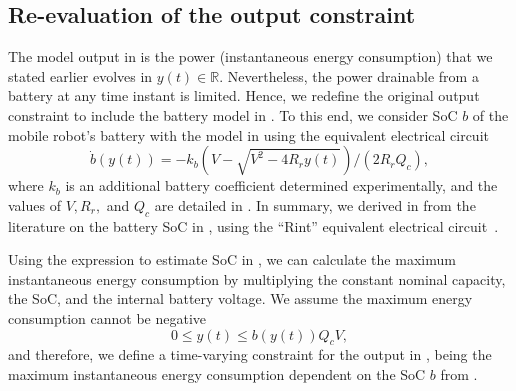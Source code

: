\subsection{Re-evaluation of the output constraint}
\label{sec:mpc-output-const}

The model output in  is the power (instantaneous energy consumption) that we stated earlier evolves in $y(t)\in\mathbb{R}$. Nevertheless, the power drainable from a battery at any time instant is limited. Hence, we redefine the original output constraint to include the battery model in . To this end, we consider SoC $b$ of the mobile robot's battery with the model in  using the equivalent electrical circuit
\begin{equation}\label{eq:bat}
  \dot{b}(y(t))=-k_b\left(V-
  \sqrt{
    V^2-
    4R_ry(t)}
  \right)/(2R_rQ_c),
\end{equation}
where $k_b$ is an additional battery coefficient determined experimentally, and the values of $V,R_r,$ and $Q_c$ are detailed in .
In summary, we derived  in  from the literature on the battery SoC in , using the ``Rint'' equivalent electrical circuit~\citep{mousavi2014various,hinz2019comparison,he2011evaluation}. 

Using the expression to estimate SoC in , we can calculate the maximum instantaneous energy consumption by multiplying the constant nominal capacity, the SoC, and the internal battery voltage. We assume the maximum energy consumption cannot be negative
\begin{equation}
  0\leq y(t)\leq b(y(t))Q_cV,
\end{equation}
and therefore, we define a time-varying constraint for the output in , being the maximum instantaneous energy consumption dependent on the SoC $b$ from .

